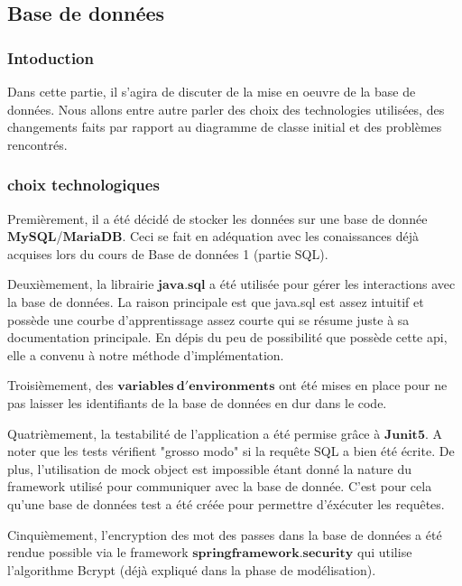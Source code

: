\subsection{Base de données}
\subsubsection{Intoduction}
\begin{flushleft}
Dans cette partie, il s'agira de discuter de la mise en oeuvre de la base de données. Nous allons entre autre parler des choix des technologies utilisées, des changements faits par rapport au diagramme de classe initial et des problèmes rencontrés.
\end{flushleft}
\subsubsection{choix technologiques}
\begin{flushleft}
    Premièrement, il a été décidé de stocker les données sur une base de donnée $\mathbf{MySQL}$/$\mathbf{MariaDB}$. Ceci se fait en adéquation avec les conaissances déjà acquises lors du cours de Base de données 1 (partie SQL). 
\end{flushleft}
\begin{flushleft}
    Deuxièmement, la librairie $\mathbf{java.sql}$ a été utilisée pour gérer les interactions avec la base de données. La raison principale est que java.sql est assez intuitif et possède une courbe d'apprentissage assez courte qui se résume juste à sa documentation principale. En dépis du peu de possibilité que possède cette api, elle a convenu à notre méthode d'implémentation.
\end{flushleft}
\begin{flushleft}
    Troisièmement, des $\mathbf{variables \ d'environments}$ ont été mises en place pour ne pas laisser les identifiants de la base de données en dur dans le code.
\end{flushleft}
\begin{flushleft}
    Quatrièmement, la testabilité de l'application a été permise grâce à $\mathbf{Junit5}$. A noter que les tests vérifient "grosso modo" si la requête SQL a bien été écrite. De plus, l'utilisation de mock object est impossible étant donné la nature du framework utilisé pour communiquer avec la base de donnée. C'est pour cela qu'une base de données test a été créée pour permettre d'éxécuter les requêtes.
\end{flushleft}
\begin{flushleft}
    Cinquièmement, l'encryption des mot des passes dans la base de données a été rendue possible via le framework $\mathbf{springframework.security}$ qui utilise l'algorithme Bcrypt (déjà expliqué dans la phase de modélisation).
\end{flushleft}
